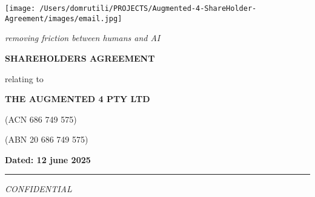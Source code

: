 \documentclass[11pt,a4paper]{article}
\begin{document}
\begin{titlepage}
    \centering
    \vspace*{1cm}
    
    \texttt{[image: /Users/domrutili/PROJECTS/Augmented-4-ShareHolder-Agreement/images/email.jpg]}
    \vspace{0.5cm}
    
    {\normalsize\itshape removing friction between humans and AI}
    \vspace{1.5cm}
    
    {\LARGE\bfseries SHAREHOLDERS AGREEMENT}
    \vspace{1.5cm}
    
    {\Large relating to}
    \vspace{0.8cm}
    
    {\Large\bfseries THE AUGMENTED 4 PTY LTD}
    \vspace{0.4cm}
    
    {\normalsize (ACN 686 749 575)}
    \vspace{0.2cm}
    
    {\normalsize (ABN 20 686 749 575)}
    \vspace{3cm}
    
    \begin{flushright}
    \textbf{Dated: 12 june 2025}
    \end{flushright}
    \vspace{3cm}
    
    \rule{0.5\textwidth}{0.5pt}
    
    \vspace{0.5cm}
    {\small\itshape CONFIDENTIAL}
\end{titlepage}

\newpage
\tableofcontents
\newpage

 



\newpage %
\end{document}

